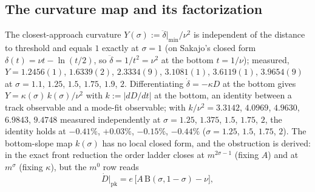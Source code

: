 \documentclass[11pt,a4paper]{article}
\theoremstyle{plain}
\theoremstyle{definition}
\newcommand{\abs}[1]{\lvert #1 \rvert}
\newcommand{\Bfun}{\mathrm{B}}
\newcommand{\pk}{\mathrm{pk}}
\begin{document}
\subsection{The curvature map and its factorization}
The closest-approach curvature $Y(\sigma):=\ddot\delta|_{\min}/\nu^2$ is independent of the distance to threshold and equals $1$ exactly at $\sigma=1$ (on Sakajo's closed form $\delta(t)=\nu t-\ln(t/2)$, so $\ddot\delta=1/t^2=\nu^2$ at the bottom $t=1/\nu$); measured, $Y=1.2456(1)$, $1.6339(2)$, $2.3334(9)$, $3.1081(1)$, $3.6119(1)$, $3.9654(9)$ at $\sigma=1.1$, $1.25$, $1.5$, $1.75$, $1.9$, $2$. Differentiating $\dot\delta=-\kappa D$ at the bottom gives $Y=\kappa(\sigma)\,k(\sigma)/\nu^2$ with $k:=\abs{dD/dt}$ at the bottom, an identity between a track observable and a mode-fit observable; with $k/\nu^2=3.3142$, $4.0969$, $4.9630$, $6.9843$, $9.4748$ measured independently at $\sigma=1.25$, $1.375$, $1.5$, $1.75$, $2$, the identity holds at $-0.41\%$, $+0.03\%$, $-0.15\%$, $-0.44\%$ ($\sigma=1.25$, $1.5$, $1.75$, $2$). The bottom-slope map $k(\sigma)$ has no local closed form, and the obstruction is derived: in the exact front reduction the order ladder closes at $m^{2\sigma-1}$ (fixing $A$) and at $m^\sigma$ (fixing $\kappa$), but the $m^0$ row reads
\begin{equation}\label{eq:m0}
\dot D|_{\pk}=e\,\big[A\,\Bfun(\sigma,1-\sigma)-\nu\big],
\end{equation}
\end{document}
